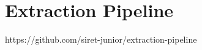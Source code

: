 \chapter{Extraction Pipeline}
\label{extraction-pipeline}


https://github.com/siret-junior/extraction-pipeline
